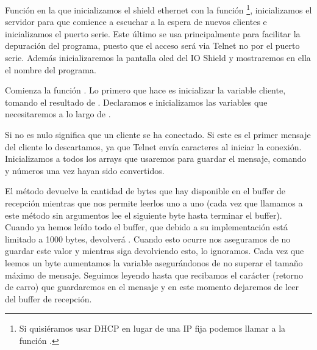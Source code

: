 
Función  en la que inicializamos el shield ethernet con la función \protect\footnote{Si quisiéramos usar DHCP en lugar de una IP fija podemos llamar a la función .}, inicializamos el servidor para que comience a escuchar a la espera de nuevos clientes e inicializamos el puerto serie. Este último se usa principalmente para facilitar la depuración del programa, puesto que el acceso será via Telnet no por el puerto serie. Además inicializaremos la pantalla oled del IO Shield y mostraremos en ella el nombre del programa.


Comienza la función . Lo primero que hace es inicializar la variable cliente, tomando el resultado de . Declaramos e inicializamos las variables que necesitaremos a lo largo de .


Si  no es nulo significa que un cliente se ha conectado. Si este es el primer mensaje del cliente lo descartamos, ya que Telnet envía caracteres al iniciar la conexión. Inicializamos a  todos los arrays que usaremos para guardar el mensaje, comando y números una vez hayan sido convertidos.


El método  devuelve la cantidad de bytes que hay disponible en el buffer de recepción mientras que  nos permite leerlos uno a uno (cada vez que llamamos a este método sin argumentos lee el siguiente byte hasta terminar el buffer). Cuando ya hemos leído todo el buffer, que debido a su implementación está limitado a 1000 bytes,  devolverá . Cuando esto ocurre nos aseguramos de no guardar este valor y mientras siga devolviendo esto, lo ignoramos. Cada vez que leemos un byte aumentamos la variable  asegurándonos de no superar el tamaño máximo de mensaje. Seguimos leyendo hasta que recibamos el carácter  (retorno de carro) que guardaremos en el mensaje y en este momento dejaremos de leer del buffer de recepción.

